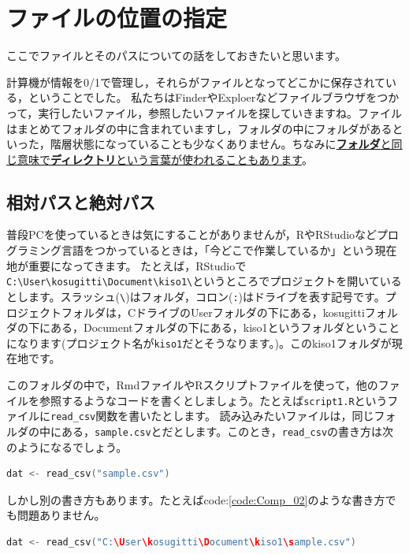 \documentclass{ltjsbook}
\begin{document}
\section{ファイルの位置の指定}
\label{setLocation}
ここでファイルとそのパスについての話をしておきたいと思います。

計算機が情報を0/1で管理し，それらがファイルとなってどこかに保存されている，ということでした。
私たちはFinderやExploerなどファイルブラウザをつかって，実行したいファイル，参照したいファイルを探していきますね。ファイルはまとめてフォルダの中に含まれていますし，フォルダの中にフォルダがあるといった，階層状態になっていることも少なくありません。ちなみに\underline{\textbf{フォルダ}と同じ意味で\textbf{ディレクトリ}という言葉が使われることもあります}。

\subsection{相対パスと絶対パス}
普段PCを使っているときは気にすることがありませんが，RやRStudioなどプログラミング言語をつかっているときは，「今どこで作業しているか」という現在地が重要になってきます。
たとえば，RStudioで\verb|C:\User\kosugitti\Document\kiso1\|というところでプロジェクトを開いているとします。スラッシュ(\verb|\|)はフォルダ，コロン(\verb|:|)はドライブを表す記号です。プロジェクトフォルダは，CドライブのUserフォルダの下にある，kosugittiフォルダの下にある，Documentフォルダの下にある，kiso1というフォルダということになります(プロジェクト名が\texttt{kiso1}だとそうなります。)。このkiso1フォルダが現在地です。

このフォルダの中で，RmdファイルやRスクリプトファイルを使って，他のファイルを参照するようなコードを書くとしましょう。たとえば\verb|script1.R|というファイルに\verb|read_csv|関数を書いたとします。
読み込みたいファイルは，同じフォルダの中にある，\verb|sample.csv|とだとします。このとき，\verb|read_csv|の書き方は次のようになるでしょう。

\begin{lstlisting}[language=c++,label={code:Comp_01},caption={相対パスで読み込む}]
dat <- read_csv("sample.csv")
\end{lstlisting}

しかし別の書き方もあります。たとえばcode:\ref{code:Comp_02}のような書き方でも問題ありません。
\begin{lstlisting}[language=c++,label={code:Comp_02},caption={絶対パスで読み込む}]
dat <- read_csv("C:\User\kosugitti\Document\kiso1\sample.csv")
\end{lstlisting}
\end{document}
